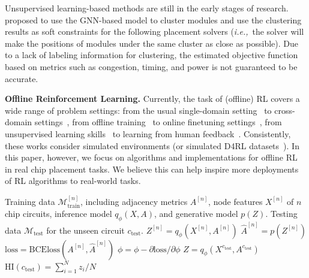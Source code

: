 \documentclass{article}
\newcommand{\ie}{\textit{i.e.,}~}
\theoremstyle{plain}
\theoremstyle{definition}
\theoremstyle{remark}
\begin{document}
Unsupervised learning-based methods are still in the early stages of research. \citet{lu2022placement} proposed to use the GNN-based model to cluster modules and use the clustering results as soft constraints for the following placement solvers (\ie the solver will make the positions of modules under the same cluster as close as possible). Due to a lack of labeling information for clustering, the estimated objective function based on metrics such as congestion, timing, and power is not guaranteed to be accurate.


\textbf{Offline Reinforcement Learning.} Currently,  the task of (offline) RL covers a wide range of problem settings: from the usual single-domain setting~\citep{levine2020offline} to cross-domain settings~\citep{liu2021unsupervised, liudara2022}, from offline training~\citep{fujimoto2019off, zhuang2023behavior} to online finetuning settings~\citep{xie2021policy, lee2022offline}, from unsupervised learning skills~\citep{chebotar2021actionable, tian2021unsupervised, tian2021independent, liu2022learn} to learning from human feedback~\citep{shin2021offline, kang2023beyond}. Consistently, these works consider simulated environments (or simulated D4RL datasets~\citep{fu2020d4rl}). In this paper, however, we focus on algorithms and implementations for offline RL in real chip placement tasks. We believe this can help inspire more deployments of RL algorithms to real-world tasks. 





{\centering
\begin{minipage}{.6\linewidth}
\begin{algorithm}[H]
   \caption{Generate circuit token $\text{HI}(c_{test})$}
   \label{alg-circuit-token}
\begin{algorithmic}[1]
    Training data $\mathcal{M}_{\text{train}}^{[n]}$, including adjacency metrics $A^{[n]}$, node features $X^{[n]}$ of $n$ chip circuits, inference model $q_{\phi}(X,A)$, and generative model $p(Z)$. Testing data $\mathcal{M}_{\text{test}}$ for the unseen circuit $c_{\text{test}}$.
   \STATE $Z^{[n]} =q_{\phi}(X^{[n]},A^{[n]})$
   \STATE $\hat{A}^{[n]} = p(Z^{[n]})$
   \STATE $\text{loss} = \text{BCEloss}(A^{[n]}, \hat{A}^{[n]})$
   \STATE $\phi = \phi - \partial \text{loss}/\partial \phi$
   \ENDFOR
   \STATE $Z =q_{\phi}(X^{c_{\text{test}}},A^{c_{\text{test}}})$
   \COMMENT{\textcolor{blue}{Generate latent variables for N macros.}}
   \STATE $\text{HI}(c_{\text{test}}) = \sum_{i=1}^N{z_i}/N$ 
   \COMMENT{\textcolor{blue}{Circuit token (chip representation) is the average pooling for all variables of macros}}
\end{algorithmic}
\end{algorithm}
\end{minipage}
\par
}
\end{document}
